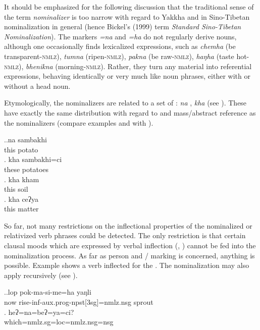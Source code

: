 \largerpage
It should be emphasized for the following discussion that the traditional sense of the term \emph{nominalizer} is too narrow with regard to Yakkha and in Sino-Tibetan nominalization in general (hence Bickel's (1999) term \emph{Standard Sino-Tibetan Nominalization}).  The markers \emph{=na} and \emph{=ha} do not regularly derive nouns, although one occasionally finds lexicalized expressions, such as \emph{chemha}  (be trans\-parent-\textsc{nmlz}),  \emph{tumna}  (ripen-\textsc{nmlz}), \emph{pakna}  (be raw-\textsc{nmlz}), \emph{haŋha}  (taste hot-\textsc{nmlz}), \emph{bhenikna}  (morning-\textsc{nmlz}). Rather, they  turn any material into referential expressions, behaving identically or very much like noun phrases, either with or without a head noun. 


Etymologically, the nominalizers are related to a set of : \emph{na} , \emph{kha}  (see ). These  have exactly the same distribution with regard to  and mass/abstract reference as the nominalizers (compare examples \LLast and \Last with \Next).


\ex.\ag.na sambakhi\\
this potato\\
\bg. kha sambakhi=ci\\
these potatoes\\
\bg. kha kham\\
this soil\\
\bg. kha ceʔya\\
this matter\\


		 
So far, not many restrictions on the inflectional properties of the nominalized or relativized verb phrases could be detected. The only restriction is that certain clausal moods which are expressed by verbal inflection (, ) cannot be fed into the nominalization process. As far as person and / marking is concerned, anything is possible. Example \Next[a] shows a verb inflected for the . The nominalization may also apply recursively (see \Next[b]).


 \ex.\ag.lop pok-ma-si-me=ha yaŋli\\
 now rise-{\sc inf-aux.prog-npst[3sg]=nmlz.nsg} sprout\\
\bg.  	heʔ=na=beʔ=ya=ci?\\
		which{\sc =nmlz.sg=loc=nmlz.nsg=nsg}\\

